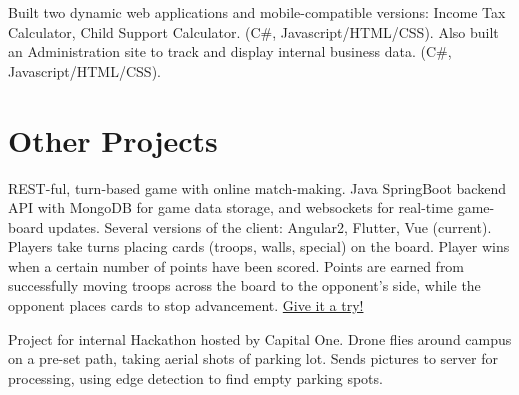 \documentclass[letterpaper]{deedy-resume-openfont} %
\begin{document}
\begin{minipage}[t]{0.7\textwidth}
\sectionsep %



Built two dynamic web applications and mobile-compatible versions: Income Tax Calculator, Child Support Calculator. (C\#, Javascript/HTML/CSS). Also built an Administration site to track and display internal business data. (C\#, Javascript/HTML/CSS).


\sectionsep %


\section{Other Projects}



REST-ful, turn-based game with online match-making. Java SpringBoot backend API with MongoDB for game data storage, and websockets for real-time game-board updates. Several versions of the client: Angular2, Flutter, Vue (current). Players take turns placing cards (troops, walls, special) on the board. Player wins when a certain number of points have been scored. Points are earned from successfully moving troops across the board to the opponent's side, while the opponent places cards to stop advancement. \href{yaylinda.github.io/my-website-vue-v2/simple-war}{Give it a try!}

\sectionsep %


Project for internal Hackathon hosted by Capital One. Drone flies around campus on a pre-set path, taking aerial shots of parking lot. Sends pictures to server for processing, using edge detection to find empty parking spots. 

\sectionsep %



\end{minipage}
\end{document}
